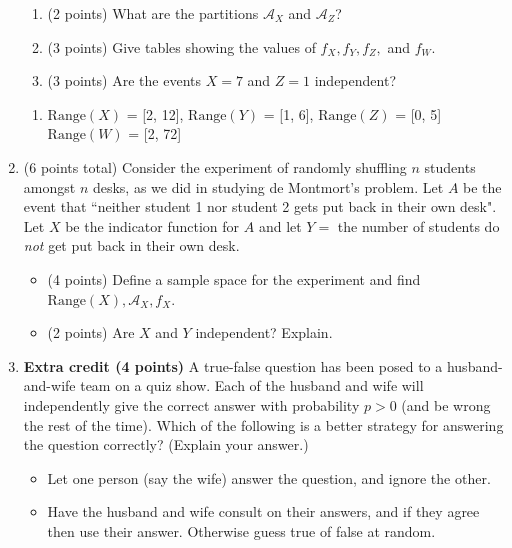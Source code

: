 \documentclass[11pt]{article}
\newcommand{\Range}{{\mathrm{Range}}}
\newcommand{\A}{{\mathcal{A}}}
\begin{document}
\begin{enumerate}
\begin{enumerate}
 \item (2 points) What are the partitions $\A_X$ and $\A_Z$?
 \item (3 points) Give tables showing the values of $f_X,f_Y,f_Z,$ and $f_W$.
 \item (3 points) Are the events $X =7$ and $Z=1$ independent?
\end{enumerate}

\begin{enumerate}
	\item $\Range(X)$ = [2, 12], $\Range(Y)$ = [1, 6], $\Range(Z)$ = [0, 5]
	$\Range(W)$ = [2, 72]
\end{enumerate}

\item (6 points total) Consider the experiment of randomly shuffling
$n$ students amongst $n$ desks, as we did in studying de Montmort's problem.
Let $A$ be the event that ``neither student 1 nor student 2 gets
put back in their own desk".
Let $X$ be the indicator function for $A$ and let $Y = $ the number of
students do \emph{not} get put back in their own desk.

\begin{itemize}
\item (4 points) Define a sample space for the experiment and find 
$\Range(X), \A_X, f_X$.
\item (2 points) Are $X$ and $Y$ independent?  Explain.
\end{itemize}

\item \textbf{Extra credit (4 points)} A true-false question has been
posed to a husband-and-wife team on a quiz show.  Each of the husband
and wife will independently give the correct answer with probability $p>0$
(and be wrong the rest of the time).
Which of the following is a better strategy for answering the question 
correctly?  (Explain your answer.)
\begin{itemize}
\item Let one person (say the wife) answer the question, and ignore the other.
\item Have the husband and wife consult on their answers, and if they agree
then use their answer.  Otherwise guess true of false at random.
\end{itemize}
\end{enumerate}
\end{document}
